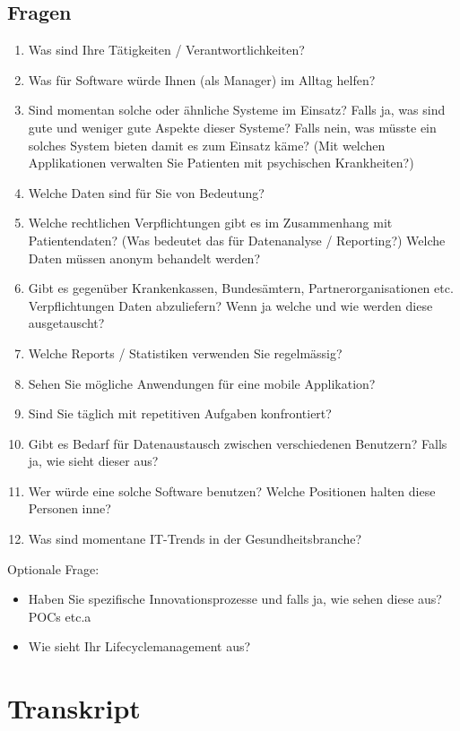 \documentclass[a4paper]{scrartcl}
\begin{document}
\subsection{Fragen}
\begin{enumerate}
\item Was sind Ihre Tätigkeiten / Verantwortlichkeiten?
\item Was für Software würde Ihnen (als Manager) im Alltag helfen?
\item Sind momentan solche oder ähnliche Systeme im Einsatz? Falls ja, was sind gute und weniger gute Aspekte dieser Systeme? Falls nein, was müsste ein solches System bieten damit es zum Einsatz käme? (Mit welchen Applikationen verwalten Sie Patienten mit psychischen Krankheiten?)
\item Welche Daten sind für Sie von Bedeutung?
\item Welche rechtlichen Verpflichtungen gibt es im Zusammenhang mit Patientendaten? (Was bedeutet das für Datenanalyse / Reporting?) Welche Daten müssen anonym behandelt werden?
\item Gibt es gegenüber Krankenkassen, Bundesämtern, Partnerorganisationen etc. Verpflichtungen Daten abzuliefern? Wenn ja welche und wie werden diese ausgetauscht?
\item Welche Reports / Statistiken verwenden Sie regelmässig?
\item Sehen Sie mögliche Anwendungen für eine mobile Applikation?
\item Sind Sie täglich mit repetitiven Aufgaben konfrontiert?

\item Gibt es Bedarf für Datenaustausch zwischen verschiedenen Benutzern? Falls ja, wie sieht dieser aus?
\item Wer würde eine solche Software benutzen? Welche Positionen halten diese Personen inne?
\item Was sind momentane IT-Trends in der Gesundheitsbranche?

\end{enumerate}

Optionale Frage:
\begin{itemize}
\item Haben Sie spezifische Innovationsprozesse und falls ja, wie sehen diese aus? POCs etc.a
\item Wie sieht Ihr Lifecyclemanagement aus?
\end{itemize}


\section{Transkript}
\end{document}
